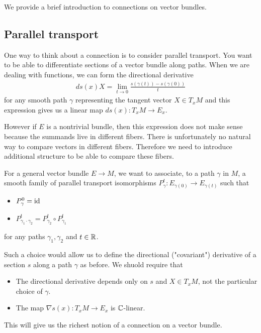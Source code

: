 We provide a brief introduction to connections on vector bundles.
\subsection{Parallel transport}
One way to think about a connection is to consider parallel transport. You want to 
be able to differentiate sections of a vector bundle along paths. When we are dealing with functions,
we can form the directional derivative  \begin{align*}
    ds(x)X = \lim_{t\to 0}\frac{s(\gamma(t)) - s(\gamma(0))}{t}
\end{align*} for any smooth path $\gamma$ representing the tangent vector $X\in T_xM$ 
and this expression gives us a linear map $ds(x):T_xM\to E_x$.

However if $E$ is a nontrivial bundle, then this expression does not make sense because the
 summands live in different fibers. There is unfortunately no natural way to 
 compare vectors in different fibers. Therefore we need to introduce additional structure to 
 be able to compare these fibers.

For a general vector bundle $E\to M$, we want to associate, to a path $\gamma$ in $M$, a smooth family of 
parallel transport isomorphisms $P^t_\gamma: E_{\gamma(0)}\to E_{\gamma(t)}$ such that \begin{itemize}
    \item $P^0_\gamma = \operatorname{id}$
    \item $P^t_{\gamma_1\cdot\gamma_2} = P^t_{\gamma_2}\circ P^t_{\gamma_1}$
\end{itemize} for any paths $\gamma_1,\gamma_2$ and $t\in\mathbb{R}$.


Such a choice would allow us to define the directional ("covariant") derivative of a section $s$ along a path $\gamma$ 
as before. We shuold require that \begin{itemize}
    \item The directional derivative depends only on $s$ and $X\in T_xM$, not the particular 
    choice of $\gamma$.
    \item The map $\nabla s(x):T_xM\to E_x$ is $\mathbb{C}$-linear.
\end{itemize}
This will give us the richest notion of a connection on a vector bundle.
